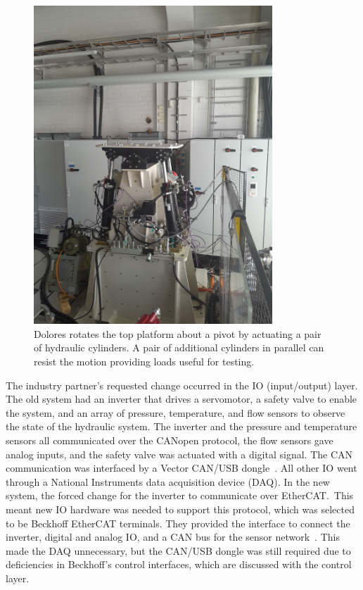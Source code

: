 \documentclass[english,12pt,a4paper,pdftex,eng,utf8]{aaltothesis}
\begin{document}
\begin{figure}[h!]
  \centering
  \includegraphics[width=0.8\textwidth]{assets/dolores}
  \caption{Dolores rotates the top platform about a pivot by actuating a pair of hydraulic cylinders.  A pair of additional cylinders in parallel can resist the motion providing loads useful for testing.}\label{fig:dolores0}
\end{figure}

The industry partner's requested change occurred in the IO (input/output) layer. The old system had an inverter that drives a servomotor, a safety valve to enable the system, and an array of pressure, temperature, and flow sensors to observe the state of the hydraulic system. The inverter and the pressure and temperature sensors all communicated over the CANopen protocol, the flow sensors gave analog inputs, and the safety valve was actuated with a digital signal. The CAN communication was interfaced by a Vector CAN/USB dongle~\cite{VectorCanUsbDongle}. All other IO went through a National Instruments data acquisition device (DAQ). In the new system, the forced change for the inverter to communicate over EtherCAT.\ This meant new IO hardware was needed to support this protocol, which was selected to be Beckhoff EtherCAT terminals. They provided the interface to connect the inverter, digital and analog IO, and a CAN bus for the sensor network~\cite{BeckhoffEL6751}. This made the DAQ unnecessary, but the CAN/USB dongle was still required due to deficiencies in Beckhoff's control interfaces, which are discussed with the control layer.
\end{document}
